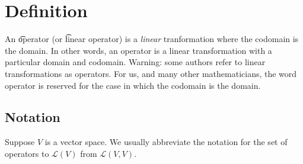
\section*{Definition}

An \t{operator} (or \t{linear operator}) is a \textit{linear} tranformation where the codomain is the domain.
In other words, an operator is a linear transformation with a particular domain and codomain.
Warning: some authors refer to linear transformations as operators.
For us, and many other mathematicians, the word operator is reserved for the case in which the codomain is the domain.

\subsection*{Notation}

Suppose $V$ is a vector space.
We usually abbreviate the notation for the set of operators to $\mathcal{L} (V)$ from $\mathcal{L} (V, V)$.

\blankpage